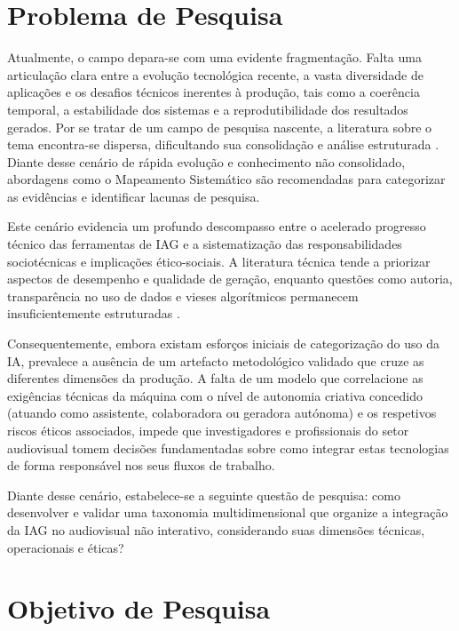 \section{Problema de Pesquisa}

Atualmente, o campo depara-se com uma evidente fragmentação. Falta uma articulação clara entre a evolução tecnológica recente, a vasta diversidade de aplicações e os desafios técnicos inerentes à produção, tais como a coerência temporal, a estabilidade dos sistemas e a reprodutibilidade dos resultados gerados. Por se tratar de um campo de pesquisa nascente, a literatura sobre o tema encontra-se dispersa, dificultando sua consolidação e análise estruturada \citep{edmondson2007}. Diante desse cenário de rápida evolução e conhecimento não consolidado, abordagens como o Mapeamento Sistemático \citep{petersen2008systematic} são recomendadas para categorizar as evidências e identificar lacunas de pesquisa.

Este cenário evidencia um profundo descompasso entre o acelerado progresso técnico das ferramentas de IAG e a sistematização das responsabilidades sociotécnicas e implicações ético-sociais. A literatura técnica tende a priorizar aspectos de desempenho e qualidade de geração, enquanto questões como autoria, transparência no uso de dados e vieses algorítmicos permanecem insuficientemente estruturadas \citep{floridi2020gpt3}.

Consequentemente, embora existam esforços iniciais de categorização do uso da IA, prevalece a ausência de um artefacto metodológico validado que cruze as diferentes dimensões da produção. A falta de um modelo que correlacione as exigências técnicas da máquina com o nível de autonomia criativa concedido (atuando como assistente, colaboradora ou geradora autónoma) e os respetivos riscos éticos associados, impede que investigadores e profissionais do setor audiovisual tomem decisões fundamentadas sobre como integrar estas tecnologias de forma responsável nos seus fluxos de trabalho.

Diante desse cenário, estabelece-se a seguinte questão de pesquisa: como desenvolver e validar uma taxonomia multidimensional que organize a integração da IAG no audiovisual não interativo, considerando suas dimensões técnicas, operacionais e éticas?

\section{Objetivo de Pesquisa}
\label{sec:intro:objetivo}

